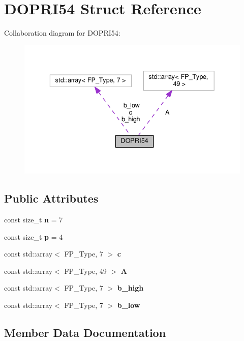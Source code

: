\hypertarget{structDOPRI54}{}\section{D\+O\+P\+R\+I54 Struct Reference}
\label{structDOPRI54}


Collaboration diagram for D\+O\+P\+R\+I54\+:\nopagebreak
\begin{figure}[H]
\begin{center}
\leavevmode
\includegraphics[width=336pt]{structDOPRI54__coll__graph}
\end{center}
\end{figure}
\subsection*{Public Attributes}
\begin{DoxyCompactItemize}
\item 
\mbox{\label{structDOPRI54_a5696f5102cc30b9d75e2ed881bbd6e97}} 
const size\+\_\+t {\bfseries n} = 7
\item 
\mbox{\label{structDOPRI54_a2ba7362999ab075d019a132607acba04}} 
const size\+\_\+t {\bfseries p} = 4
\item 
const std\+::array$<$ F\+P\+\_\+\+Type, 7 $>$ {\bfseries c}
\item 
const std\+::array$<$ F\+P\+\_\+\+Type, 49 $>$ {\bfseries A}
\item 
const std\+::array$<$ F\+P\+\_\+\+Type, 7 $>$ {\bfseries b\+\_\+high}
\item 
const std\+::array$<$ F\+P\+\_\+\+Type, 7 $>$ {\bfseries b\+\_\+low}
\end{DoxyCompactItemize}


\subsection{Member Data Documentation}
\mbox{\label{structDOPRI54_a12a69b426524b011c7cb1c5be7aba756}} 
